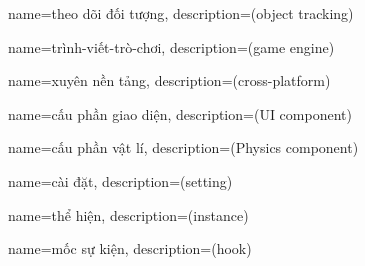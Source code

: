 {
    name={theo dõi đối tượng},
    description={(object tracking)}
}

{
    name={trình-viết-trò-chơi},
    description={(game engine)}
}

{
    name={xuyên nền tảng},
    description={(cross-platform)}
}

{
    name={cấu phần giao diện},
    description={(UI component)}
}

{
    name={cấu phần vật lí},
    description={(Physics component)}
}

{
    name={cài đặt},
    description={(setting)}
}

{
    name={thể hiện},
    description={(instance)}
}

{
    name={mốc sự kiện},
    description={(hook)}
}



